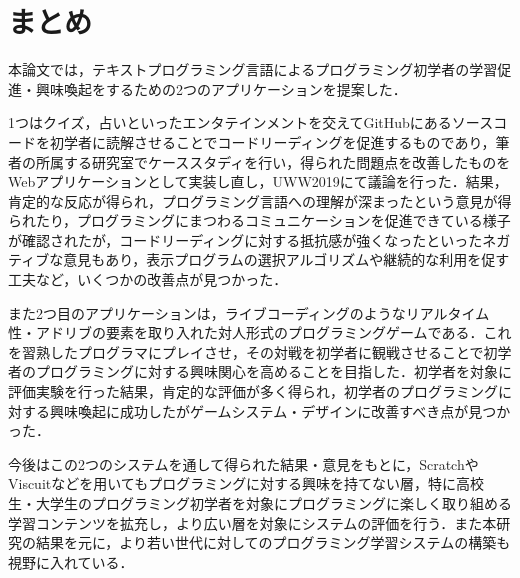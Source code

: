 \section{まとめ}

本論文では，テキストプログラミング言語によるプログラミング初学者の学習促進・興味喚起をするための2つのアプリケーションを提案した．

1つはクイズ，占いといったエンタテインメントを交えてGitHubにあるソースコードを初学者に読解させることでコードリーディングを促進するものであり，筆者の所属する研究室でケーススタディを行い，得られた問題点を改善したものをWebアプリケーションとして実装し直し，UWW2019にて議論を行った．結果，肯定的な反応が得られ，プログラミング言語への理解が深まったという意見が得られたり，プログラミングにまつわるコミュニケーションを促進できている様子が確認されたが，コードリーディングに対する抵抗感が強くなったといったネガティブな意見もあり，表示プログラムの選択アルゴリズムや継続的な利用を促す工夫など，いくつかの改善点が見つかった．

また2つ目のアプリケーションは，ライブコーディングのようなリアルタイム性・アドリブの要素を取り入れた対人形式のプログラミングゲームである．これを習熟したプログラマにプレイさせ，その対戦を初学者に観戦させることで初学者のプログラミングに対する興味関心を高めることを目指した．初学者を対象に評価実験を行った結果，肯定的な評価が多く得られ，初学者のプログラミングに対する興味喚起に成功したがゲームシステム・デザインに改善すべき点が見つかった．

今後はこの2つのシステムを通して得られた結果・意見をもとに，ScratchやViscuitなどを用いてもプログラミングに対する興味を持てない層，特に高校生・大学生のプログラミング初学者を対象にプログラミングに楽しく取り組める学習コンテンツを拡充し，より広い層を対象にシステムの評価を行う．また本研究の結果を元に，より若い世代に対してのプログラミング学習システムの構築も視野に入れている． 